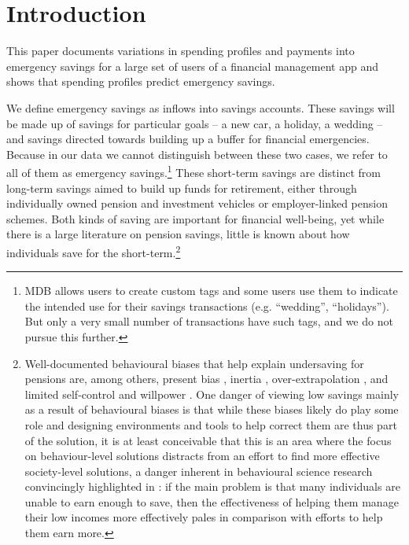 
\section{Introduction}%
\label{sec:introduction}


This paper documents variations in spending profiles and payments into
emergency savings for a large set of users of a financial management app
and shows that spending profiles predict emergency savings.

We define emergency savings as inflows into savings accounts. These savings
will be made up of savings for particular goals -- a new car, a holiday, a
wedding -- and savings directed towards building up a buffer for financial
emergencies. Because in our data we cannot distinguish between these two cases,
we refer to all of them as emergency savings.\footnote{MDB allows users to
    create custom tags and some users use them to indicate the intended use for
    their savings transactions (e.g. ``wedding'', ``holidays''). But only a very
small number of transactions have such tags, and we do not pursue this
further.} These short-term savings are distinct from long-term savings aimed to
build up funds for retirement, either through individually owned pension and
investment vehicles or employer-linked pension schemes. Both kinds of saving
are important for financial well-being, yet while there is a large literature
on pension savings, little is known about how individuals save for the
short-term.\footnote{Well-documented behavioural biases that help explain
    undersaving for pensions are, among others, present bias
    \citep{laibson1997golden, laibson2019intertemporal}, inertia
    \citep{madrian2001power}, over-extrapolation \citep{choi2009reinforcement},
    and limited self-control and willpower \citep{thaler1981economic,
    benhabib2005modeling, fudenberg2006dual, loewenstein2004animal,
gul2001temptation}. One danger of viewing low savings mainly as a result of
behavioural biases is that while these biases likely do play some role and
designing environments and tools to help correct them are thus part of the
solution, it is at least conceivable that this is an area where the focus on
behaviour-level solutions distracts from an effort to find more effective
society-level solutions, a danger inherent in behavioural science research
convincingly highlighted in \citet{chater2022frame}: if the main problem is
that many individuals are unable to earn enough to save, then the effectiveness of
helping them manage their low incomes more effectively pales in comparison with
efforts to help them earn more.}

